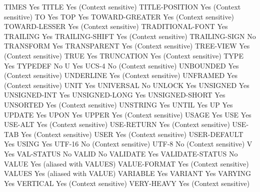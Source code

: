 TIMES                           Yes
TITLE                           Yes (Context sensitive)
TITLE-POSITION                  Yes (Context sensitive)
TO                              Yes
TOP                             Yes
TOWARD-GREATER                  Yes (Context sensitive)
TOWARD-LESSER                   Yes (Context sensitive)
TRADITIONAL-FONT                Yes
TRAILING                        Yes
TRAILING-SHIFT                  Yes (Context sensitive)
TRAILING-SIGN                   No
TRANSFORM                       Yes
TRANSPARENT                     Yes (Context sensitive)
TREE-VIEW                       Yes (Context sensitive)
TRUE                            Yes
TRUNCATION                      Yes (Context sensitive)
TYPE                            Yes
TYPEDEF                         No
U                               Yes
UCS-4                           No (Context sensitive)
UNBOUNDED                       Yes (Context sensitive)
UNDERLINE                       Yes (Context sensitive)
UNFRAMED                        Yes (Context sensitive)
UNIT                            Yes
UNIVERSAL                       No
UNLOCK                          Yes
UNSIGNED                        Yes
UNSIGNED-INT                    Yes
UNSIGNED-LONG                   Yes
UNSIGNED-SHORT                  Yes
UNSORTED                        Yes (Context sensitive)
UNSTRING                        Yes
UNTIL                           Yes
UP                              Yes
UPDATE                          Yes
UPON                            Yes
UPPER                           Yes (Context sensitive)
USAGE                           Yes
USE                             Yes
USE-ALT                         Yes (Context sensitive)
USE-RETURN                      Yes (Context sensitive)
USE-TAB                         Yes (Context sensitive)
USER                            Yes (Context sensitive)
USER-DEFAULT                    Yes
USING                           Yes
UTF-16                          No (Context sensitive)
UTF-8                           No (Context sensitive)
V                               Yes
VAL-STATUS                      No
VALID                           No
VALIDATE                        Yes
VALIDATE-STATUS                 No
VALUE                           Yes (aliased with VALUES)
VALUE-FORMAT                    Yes (Context sensitive)
VALUES                          Yes (aliased with VALUE)
VARIABLE                        Yes
VARIANT                         Yes
VARYING                         Yes
VERTICAL                        Yes (Context sensitive)
VERY-HEAVY                      Yes (Context sensitive)
